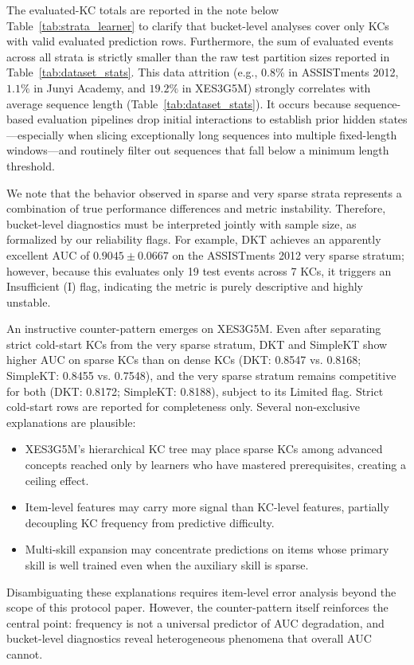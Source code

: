 

The evaluated-KC totals are reported in the note below Table~\ref{tab:strata_learner} to clarify that bucket-level analyses cover only KCs with valid evaluated prediction rows. Furthermore, the sum of evaluated events across all strata is strictly smaller than the raw test partition sizes reported in Table~\ref{tab:dataset_stats}. This data attrition (e.g., $0.8\%$ in ASSISTments 2012, $1.1\%$ in Junyi Academy, and $19.2\%$ in XES3G5M) strongly correlates with average sequence length (Table~\ref{tab:dataset_stats}). It occurs because sequence-based evaluation pipelines drop initial interactions to establish prior hidden states---especially when slicing exceptionally long sequences into multiple fixed-length windows---and routinely filter out sequences that fall below a minimum length threshold.

We note that the behavior observed in sparse and very sparse strata represents a combination of true performance differences and metric instability. Therefore, bucket-level diagnostics must be interpreted jointly with sample size, as formalized by our reliability flags. For example, DKT achieves an apparently excellent AUC of $0.9045 \pm 0.0667$ on the ASSISTments 2012 very sparse stratum; however, because this evaluates only 19 test events across 7 KCs, it triggers an Insufficient (I) flag, indicating the metric is purely descriptive and highly unstable.

An instructive counter-pattern emerges on XES3G5M. Even after separating strict cold-start KCs from the very sparse stratum, DKT and SimpleKT show higher AUC on sparse KCs than on dense KCs (DKT: 0.8547 vs. 0.8168; SimpleKT: 0.8455 vs. 0.7548), and the very sparse stratum remains competitive for both (DKT: 0.8172; SimpleKT: 0.8188), subject to its Limited flag. Strict cold-start rows are reported for completeness only. Several non-exclusive explanations are plausible:
\begin{itemize}
    \item XES3G5M's hierarchical KC tree may place sparse KCs among advanced concepts reached only by learners who have mastered prerequisites, creating a ceiling effect.
    \item Item-level features may carry more signal than KC-level features, partially decoupling KC frequency from predictive difficulty.
    \item Multi-skill expansion may concentrate predictions on items whose primary skill is well trained even when the auxiliary skill is sparse.
\end{itemize}
Disambiguating these explanations requires item-level error analysis beyond the scope of this protocol paper. However, the counter-pattern itself reinforces the central point: frequency is not a universal predictor of AUC degradation, and bucket-level diagnostics reveal heterogeneous phenomena that overall AUC cannot.

